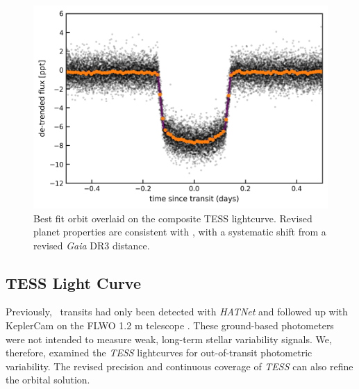 \documentclass[linenumbers, twocolumn, trackchanges]{aastex631}
\newcommand{\hatpb}{\object{HAT-P-67 b}}
\begin{document}
\begin{figure}
  \includegraphics[width=\linewidth]{best_fit_orbit.png}
  \caption{Best fit orbit overlaid on the composite TESS lightcurve.  Revised planet properties are consistent with \citet{2017AJ....153..211Z}, with a systematic shift from a revised \emph{Gaia} DR3 distance.}
  \label{fig:transit}
\end{figure}

\subsection{TESS Light Curve}
Previously, \hatpb~transits had only been detected with \emph{HATNet} \citep{2004PASP..116..266B} and followed up with KeplerCam on the FLWO 1.2 m telescope \citep{2017AJ....153..211Z}. These ground-based photometers were not intended to measure weak, long-term stellar variability signals.  We, therefore, examined the \emph{TESS} lightcurves for out-of-transit photometric variability.  The revised precision and continuous coverage of \emph{TESS} can also refine the orbital solution.
\end{document}

